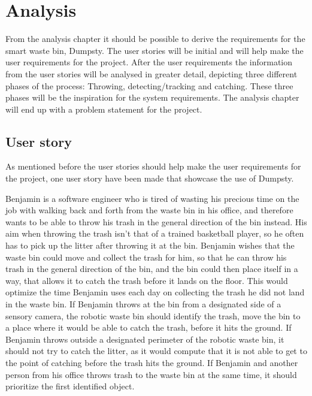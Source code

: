 \chapter{Analysis}
\label{chap:Analysis}
From the analysis chapter it should be possible to derive the requirements for the smart waste bin, Dumpsty. The user stories will be initial and will help make the user requirements for the project. After the user requirements the information from the user stories will be analysed in greater detail, depicting three different phases of the process: Throwing, detecting/tracking and catching. These three phases will be the inspiration for the system requirements. 
The analysis chapter will end up with a problem statement for the project. 

\section{User story}
\label{sec:User story}
As mentioned before the user stories should help make the user requirements for the project, one user story have been made that showcase the use of Dumpsty.

Benjamin is a software engineer who is tired of wasting his precious time on the job with walking back and forth from the waste bin in his office, and therefore wants to be able to throw his trash in the general direction of the bin instead. His aim when throwing the trash isn’t that of a trained basketball player, so he often has to pick up the litter after throwing it at the bin. \newline
Benjamin wishes that the waste bin could move and collect the trash for him, so that he can throw his trash in the general direction of the bin, and the bin could then place itself in a way, that allows it to catch the trash before it lands on the floor. This would optimize the time Benjamin uses each day on collecting the trash he did not land in the waste bin.\newline
If Benjamin throws at the bin from a designated side of a sensory camera, the robotic waste bin should identify the trash, move the bin to a place where it would be able to catch the trash, before it hits the ground.\newline
If Benjamin throws outside a designated perimeter of the robotic waste bin, it should not try to catch the litter, as it would compute that it is not able to get to the point of catching before the trash hits the ground.\newline
If Benjamin and another person from his office throws trash to the waste bin at the same time, it should prioritize the first identified object.

